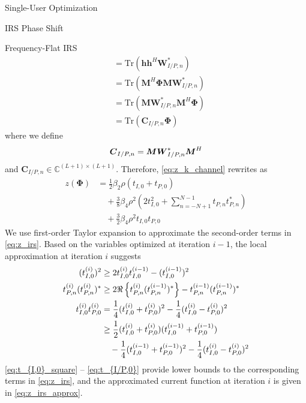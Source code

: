 \documentclass{IEEEtran}
\begin{document}
\begin{section}{Single-User Optimization}
\begin{subsection}{IRS Phase Shift}
\begin{subsubsection}{Frequency-Flat IRS}
\begin{equation}
\begin{split}
					&=\mathrm{Tr}(\boldsymbol{h}\boldsymbol{h}^H\boldsymbol{W}_{I/P,n}^*)\\
					&=\mathrm{Tr}(\boldsymbol{M}^H\boldsymbol{\Phi}\boldsymbol{M}\boldsymbol{W}_{I/P,n}^*)\\
					&=\mathrm{Tr}(\boldsymbol{M}\boldsymbol{W}_{I/P,n}^*\boldsymbol{M}^H\boldsymbol{\Phi})\\
					&=\mathrm{Tr}(\boldsymbol{C}_{I/P,n}\boldsymbol{\Phi})
				\end{split}
			\end{equation}
			where we define
			\begin{equation}\label{eq:C_{I/P,n}}
				\boldsymbol{C}_{I/P,n}=\boldsymbol{M}\boldsymbol{W}_{I/P,n}^*\boldsymbol{M}^H
			\end{equation}
			and $\boldsymbol{C}_{I/P,n} \in \mathbb{C}^{(L+1)\times(L+1)}$. Therefore, \ref{eq:z_k_channel} rewrites as
			\begin{equation}\label{eq:z_irs}
				\begin{split}
					z(\boldsymbol{\Phi})
					&=\frac{1}{2}{\beta_2}{\rho}(t_{I,0}+t_{P,0})\\
					&\quad+\frac{3}{8}{\beta_4}{\rho^2} \left(2t_{I,0}^2 + \sum_{n=-N+1}^{N-1}{t_{P,n}t_{P,n}^*}\right)\\
					&\quad+\frac{3}{2}{\beta_4}{\rho^2}t_{I,0}t_{P,0}
				\end{split}
			\end{equation}
			We use first-order Taylor expansion to approximate the second-order terms in \ref{eq:z_irs}. Based on the variables optimized at iteration $i - 1$, the local approximation at iteration $i$ suggests \cite{Adali2010}
			\begin{align}
				(t_{I,0}^{(i)})^2
				& \ge 2 t_{I,0}^{(i)}t_{I,0}^{(i-1)} - (t_{I,0}^{(i-1)})^2\label{eq:t_{I,0}_square}\\
				t_{P,n}^{(i)} (t_{P,n}^{(i)})^*
				& \ge 2 \Re\left\{t_{P,n}^{(i)} (t_{P,n}^{(i-1)})^*\right\} - t_{P,n}^{(i-1)} (t_{P,n}^{(i-1)})^*\\
				t_{I,0}^{(i)} t_{P,0}^{(i)}
				& = \frac{1}{4}(t_{I,0}^{(i)} + t_{P,0}^{(i)})^2 - \frac{1}{4}(t_{I,0}^{(i)} - t_{P,0}^{(i)})^2\nonumber\\
				& \ge \frac{1}{2}(t_{I,0}^{(i)} + t_{P,0}^{(i)})(t_{I,0}^{(i-1)} + t_{P,0}^{(i-1)})\nonumber\\
				& \quad - \frac{1}{4}(t_{I,0}^{(i-1)} + t_{P,0}^{(i-1)})^2 - \frac{1}{4}(t_{I,0}^{(i)} - t_{P,0}^{(i)})^2\label{eq:t_{I/P,0}}
			\end{align}
			\ref{eq:t_{I,0}_square} -- \ref{eq:t_{I/P,0}} provide lower bounds to the corresponding terms in \ref{eq:z_irs}, and the approximated current function at iteration $i$ is given in \ref{eq:z_irs_approx}.

\end{subsubsection}
\end{subsection}
\end{section}
\end{document}
